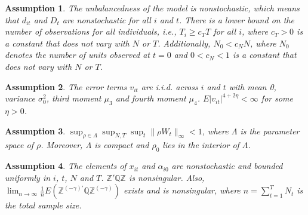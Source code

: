 \documentclass[11pt,a4paper]{article}
\newtheorem{assumption}{Assumption}
\begin{document}
\begin{assumption}\label{asp_2}
The unbalancedness of the model is nonstochastic, which means that $d_{it}$ and $D_t$ are nonstochastic for all $i$ and $t$. %
There is a lower bound on the number of observations for all individuals, i.e., $T_i\geq c_T T$ for all $i$, where $c_T>0$ is a constant that does not vary with $N$ or $T$. 
Additionally, $N_0<c_NN$, where $N_0$ denotes the number of units observed at $t=0$ and $0<c_N<1$ is a constant that does not vary with $N$ or $T$.
\end{assumption}
\begin{assumption}\label{asp_error}
The error terms $v_{it}$ are i.i.d. across $i$ and $t$ with mean 0, variance $\sigma^2_0$, third moment \(\mu_3\) and fourth moment \(\mu_4\). $E|v_{it}|^{4+2\eta}<\infty$ for some $\eta>0$. %
\end{assumption}
\begin{assumption}\label{asp_4}
$\sup_{\rho\in\Lambda}\sup_{N,T}\sup_t\|\rho W_t\|_{\infty}<1$, where $\Lambda$ is the parameter space of $\rho$. Moreover, $\Lambda$ is compact and $\rho_0$ lies in the interior of $\Lambda$.
\end{assumption}

\begin{assumption}\label{asp_X}
The elements of $x_{it}$ and $\alpha_{i0}$ are nonstochastic and bounded uniformly in $i$, $t$, $N$ and $T$. $\mathbb{Z'QZ}$ is nonsingular. Also, $\lim_{n\rightarrow\infty}\frac{1}{n}E(\mathbb{Z}^{(-\gamma)\prime}\mathbb{QZ}^{(-\gamma)})$ exists and is nonsingular, where $n=\sum_{t=1}^{T}N_t$ is the total sample size.
\end{assumption}
\end{document}
